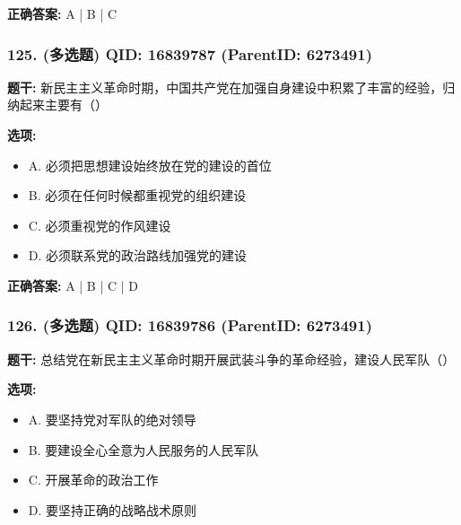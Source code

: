 \documentclass[12pt,UTF8]{ctexart}
\begin{document}
\textbf{正确答案:}
A | B | C

\vspace{0.3em}\hrulefill\vspace{0.7em}

\subsubsection*{125. (多选题) \small QID: 16839787 (ParentID: 6273491)}

\textbf{题干:}
新民主主义革命时期，中国共产党在加强自身建设中积累了丰富的经验，归纳起来主要有（）



\textbf{选项:}
\begin{itemize}[leftmargin=*]

  \item A. 必须把思想建设始终放在党的建设的首位

  \item B. 必须在任何时候都重视党的组织建设

  \item C. 必须重视党的作风建设

  \item D. 必须联系党的政治路线加强党的建设

\end{itemize}

\textbf{正确答案:}
A | B | C | D

\vspace{0.3em}\hrulefill\vspace{0.7em}

\subsubsection*{126. (多选题) \small QID: 16839786 (ParentID: 6273491)}

\textbf{题干:}
总结党在新民主主义革命时期开展武装斗争的革命经验，建设人民军队（）



\textbf{选项:}
\begin{itemize}[leftmargin=*]

  \item A. 要坚持党对军队的绝对领导

  \item B. 要建设全心全意为人民服务的人民军队

  \item C. 开展革命的政治工作

  \item D. 要坚持正确的战略战术原则

\end{itemize}
\end{document}
